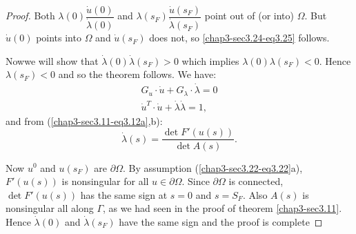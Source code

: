 \begin{proof}
Both $\lambda (0) \dfrac{\dot{u}(0)}{\dot{\lambda}(0)}$ and
$\lambda(s_F) \dfrac{\dot{u}(s_F)}{\dot{\lambda}(s_F)}$ point out of
(or into) $\Omega$. But $\dot{u}(0)$ points into $\Omega$ and
$\dot{u}(s_F)$ does not, so \eqref{chap3-sec3.24-eq3.25}  follows. 

Now\pageoriginale we will show that $\dot{\lambda} (0)
\dot{\lambda}(s_F) > 0$ which 
implies $\lambda (0)\lambda (s_F) < 0$. Hence $\lambda (s_F) < 0$ and
so the theorem follows. We have:  
\begin{gather*}
G_u \cdot\dot{u} + G_\lambda  \cdot \dot{\lambda} = 0\\[3pt]
\dot{u}^T \cdot  \dot{u} +\dot{\lambda} \dot{\lambda} = 1,
\end{gather*} 
and from (\ref{chap3-sec3.11-eq3.12a},b):
$$
\dot{\lambda}(s) = \frac{\det F' (u(s))}{\det A (s)}. 
$$ 

Now $u^0$ and $u(s_F)$ are $\partial \Omega$. By assumption
(\ref{chap3-sec3.22-eq3.22}a),%
$F'(u(s))$ is nonsingular for all $u \in \partial \Omega$. Since
$\partial \Omega$ is connected, $\det F'(u(s))$ has the same sign at
$s = 0$ and $s = S_F$. Also $A(s)$ is nonsingular all along $\Gamma$,
as we had seen in the proof of theorem \ref{chap3-sec3.11}. Hence
$\dot{\lambda}(0)$ 
and $\dot{\lambda} (s_F)$ have the same sign and the proof is
complete 
\end{proof}
